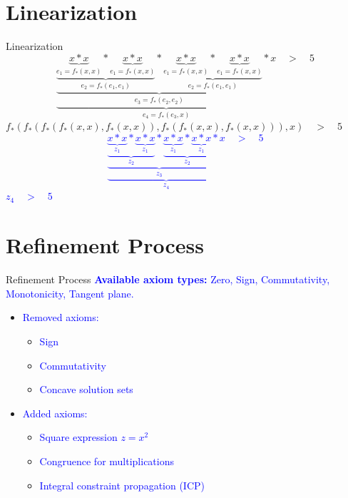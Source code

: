 \documentclass[]{beamer}
\begin{document}
\section{Linearization}
\begin{frame}{Linearization}
         $$\underbrace{ \underbrace{ \underbrace{ \underbrace{ x \ast x }\limits_{e_1 = f_{*}(x, x)} \ast \underbrace{ x \ast x }\limits_{e_1 = f_{*}(x, x)}}\limits_{e_{2} = f_{*}(e_{1}, e_{1})} \ast \underbrace{ \underbrace{ x \ast x }\limits_{e_1 = f_{*}(x, x)} \ast \underbrace{ x \ast x }\limits_{e_1 = f_{*}(x, x)}}\limits_{e_{2} = f_{*}(e_{1}, e_{1})}}\limits_{e_{3} = f_{*}(e_{2}, e_{2})} \ast x}\limits_{e_{4} = f_{*}(e_{3}, x)}  \quad > \quad 5$$
        $f_{*}(f_{*}(f_{*}(f_{*}(x, x), f_{*}(x, x)), f_{*}(f_{*}(x, x), f_{*}(x, x))), x) \quad > \quad 5$
         \textcolor{blue}{$$\underbrace{ \underbrace{ \underbrace{ \underbrace{ x \ast x }\limits_{z_{1}} \ast \underbrace{ x \ast x }\limits_{z_{1}}}\limits_{z_{2}} \ast \underbrace{ \underbrace{ x \ast x }\limits_{z_{1}} \ast \underbrace{ x \ast x }\limits_{z_{1}}}\limits_{z_{2}}}\limits_{z_{3}} \ast x}\limits_{z_{4}}  \quad > \quad 5$$
        $z_{4}  \quad > \quad 5$}
\end{frame}

\section{Refinement Process}
\begin{frame}{Refinement Process}
    \textcolor<1>{blue}{\textbf{Available axiom types: }Zero, \textcolor<3>{green!80!black}{Sign, Commutativity}, Monotonicity, Tangent plane.}
    \bigskip
    \bigskip
    \begin{itemize}
        \item \textcolor<2-4>{blue}{Removed axioms:}
            \begin{itemize}
                \item \textcolor<3>{blue}{Sign}
                \item \textcolor<3>{blue}{Commutativity}
                \item \textcolor<4>{blue}{Concave solution sets}
            \end{itemize}
        \bigskip
        \bigskip
        \item \textcolor<5>{blue}{Added axioms:}
            \begin{itemize}
                \item \textcolor<5>{blue}{Square expression $z = x^2$}
                \item \textcolor<5>{blue}{Congruence for multiplications}
                \item \textcolor<5>{blue}{Integral constraint propagation (ICP)}
            \end{itemize}
    \end{itemize}
\end{frame}
\end{document}
